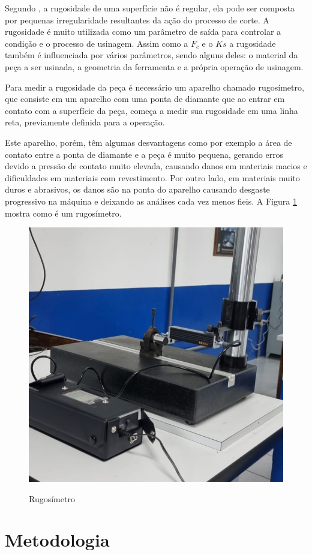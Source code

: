 \documentclass[deposito, acronym, symbols]{fei}
\begin{document}
Segundo \textcite{machado2015teoria}, a rugosidade de uma superfície não é regular, ela pode ser composta por pequenas irregularidade resultantes da ação do processo de corte. A rugosidade é muito utilizada como um parâmetro de saída para controlar a condição e o processo de usinagem. Assim como a $F_c$ e o $Ks$ a rugosidade também é influenciada por vários parâmetros, sendo alguns deles: o material da peça a ser usinada, a geometria da ferramenta e a própria operação de usinagem.

Para medir a rugosidade da peça é necessário um aparelho chamado rugosímetro, que consiste em um aparelho com uma ponta de diamante que ao entrar em contato com a superfície da peça, começa a medir sua rugosidade em uma linha reta, previamente definida para a operação. 

Este aparelho, porém, têm algumas desvantagens como por exemplo a área de contato entre a ponta de diamante e a peça é muito pequena, gerando erros devido a pressão de contato muito elevada, causando danos em materiais macios e dificuldades em materiais com revestimento. Por outro lado, em materiais muito duros e abrasivos, os danos são na ponta do aparelho causando desgaste progressivo na máquina e deixando as análises cada vez menos fieis. A Figura \ref{fig:rugosimetro} mostra como é um rugosímetro.

\begin{figure}[!htp]
    \centering
    \caption{Rugosímetro}
    \includegraphics[width=0.6\linewidth]{Imagens/Exp01_rugosidade - Copia.jpeg}
    \label{fig:rugosimetro}
\end{figure}


\chapter{Metodologia}
\end{document}

